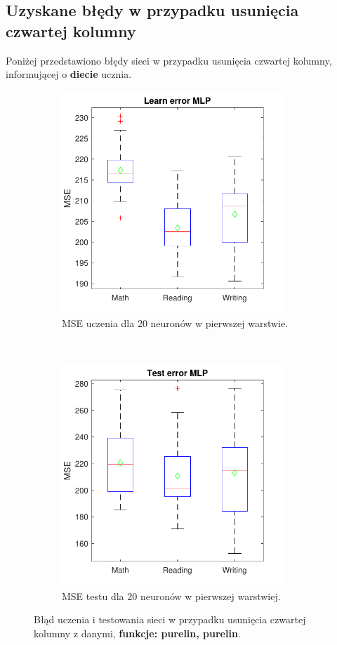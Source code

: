 \documentclass[12pt]{article}
\begin{document}
\pagebreak
\subsection{Uzyskane błędy w przypadku usunięcia czwartej kolumny}
Poniżej przedstawiono błędy sieci w przypadku usunięcia czwartej kolumny, informującej o \textbf{diecie} ucznia.
\begin{figure}[H]
\centering
\begin{subfigure}[t]{0.48\textwidth} 
\centering
\includegraphics[height=3.3in]{purelin_purelin_20_without_4_learnBoxplot.pdf}
\caption{MSE uczenia dla  20 neuronów w pierwszej warstwie.}
\end{subfigure}
~~
\begin{subfigure}[t]{0.48\textwidth} 
\centering
\includegraphics[height=3.3in]{purelin_purelin_20_without_4_testBoxplot.pdf}
\caption{MSE testu dla  20  neuronów w pierwszej warstwiej.}
\end{subfigure}

\caption{Błąd uczenia i testowania sieci w przypadku usunięcia czwartej  kolumny z danymi, \textbf{funkcje: purelin, purelin}.}
\end{figure}
\end{document}
